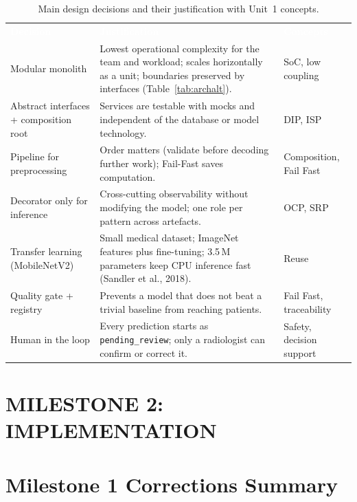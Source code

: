 \documentclass[12pt,a4paper]{article}
\newcommand{\hd}[1]{\textcolor{white}{\textbf{#1}}}
\begin{document}
\begin{table}[H]
\centering
\caption{Main design decisions and their justification with Unit~1 concepts.}
\label{tab:justification}
\renewcommand{\arraystretch}{1.3}
\begin{tabularx}{\textwidth}{L{3.3cm} Y L{2.7cm}}
\hd{Decision} & \hd{Justification} & \hd{Concepts} \\
Modular monolith & Lowest operational complexity for the team and workload; scales horizontally as a unit; boundaries preserved by interfaces (Table~\ref{tab:archalt}). & SoC, low coupling \\
Abstract interfaces + composition root & Services are testable with mocks and independent of the database or model technology. & DIP, ISP \\
Pipeline for preprocessing & Order matters (validate before decoding further work); Fail-Fast saves computation. & Composition, Fail Fast \\
Decorator only for inference & Cross-cutting observability without modifying the model; one role per pattern across artefacts. & OCP, SRP \\
Transfer learning (MobileNetV2) & Small medical dataset; ImageNet features plus fine-tuning; 3.5\,M parameters keep CPU inference fast (Sandler et al., 2018). & Reuse \\
Quality gate + registry & Prevents a model that does not beat a trivial baseline from reaching patients. & Fail Fast, traceability \\
Human in the loop & Every prediction starts as \texttt{pending\_review}; only a radiologist can confirm or correct it. & Safety, decision support \\
\end{tabularx}
\end{table}

\newpage
\section*{MILESTONE 2: IMPLEMENTATION}

\section{Milestone 1 Corrections Summary}
\label{sec:m1corr}
\end{document}

